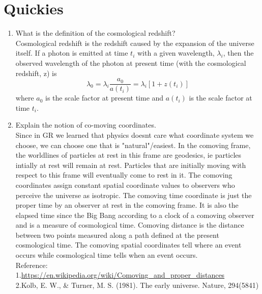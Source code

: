 	\section{Quickies}

\begin{enumerate}[label=(\alph*)]
	\item What is the definition of the cosmological redshift? \\
		Cosmological redshift is the redshift caused by the expansion of the universe itself. If a photon is emitted at time $t_i$ with a given wavelength, $\lambda_i$, then the observed wavelength of the photon at present time (with the cosmological redshift, z) is 
		\begin{equation}
			\lambda_0 = \lambda_i \frac{a_0}{a(t_i)} = \lambda_i \left[ 1 + z(t_i) \right]
		\end{equation}
where $a_0$ is the scale factor at present time and $a(t_i)$ is the scale factor at time $t_i$.

	\item Explain the notion of co-moving coordinates. \\
		Since in GR we learned that physics doesnt care what coordinate system we choose, we can choose one that is "natural"/easiest. 	In the comoving frame, the worldlines of particles at rest in this frame are geodesics, ie particles intially at rest will remain at rest. Particles that are initially moving with respect to this frame will eventually come to rest in it. The comoving coordinates assign constant spatial coordinate values to observers who perceive the universe as isotropic. The comoving time coordinate is just the proper time by an observer at rest in the comoving frame. It is also the elapsed time since the Big Bang according to a clock of a comoving observer and is a measure of cosmological time. Comoving distance is the distance between two points measured along a path defined at the present cosmological time. The comoving spatial coordinates tell where an event occurs while cosmological time tells when an event occurs.\\
Reference:\\
1.\hyperlink{https://en.wikipedia.org/wiki/Comoving_and_proper_distances}{https://en.wikipedia.org/wiki/Comoving\_and\_proper\_distances} \\
2.Kolb, E. W., \& Turner, M. S. (1981). The early universe. Nature, 294(5841)
\end{enumerate} 

